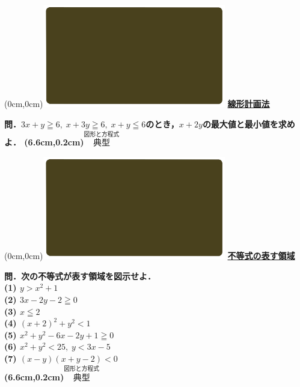 \documentclass[10pt,
fleqn,
dvipdfmx,
uplatex
]{jsarticle}
\begin{document}
\at(0cm,0cm){\includegraphics[width=8cm,bb=0 0 1920 1080]{./youtube/thumbnails/templates/smart_background/図形と方程式.jpeg}}
{\color{orange}\bf\boldmath\huge\underline{線形計画法}}\vspace{0.3zw}

\LARGE 
\bf\boldmath 問．$3x+y\geqq 6,\;x+3y\geqq 6,\;x+y\leqq 6$のとき，$x+2y$の最大値と最小値を求めよ．
\at(6.6cm,0.2cm){\small\color{bradorange}$\overset{\text{図形と方程式}}{\text{典型}}$}


\newpage



\at(0cm,0cm){\includegraphics[width=8cm,bb=0 0 1920 1080]{./youtube/thumbnails/templates/smart_background/図形と方程式.jpeg}}
{\color{orange}\bf\boldmath\huge\underline{不等式の表す領域}}\vspace{0.3zw}

\small 
\bf\boldmath 問．次の不等式が表す領域を図示せよ．\\
(1)  $y>x^2+1$\\
(2)  $3x-2y-2\geqq 0$\\
(3)  $x\leqq 2$\\
(4)  $\left(x+2\right)^2+y^2<1$\\
(5)  $x^2+y^2-6x-2y+1\geqq 0$\\
(6)  $x^2+y^2<{25},\;y<3x-5$\\
(7)  $\left(x-y\right)\left(x+y-2\right)<0$\\

\at(6.6cm,0.2cm){\small\color{bradorange}$\overset{\text{図形と方程式}}{\text{典型}}$}


\newpage
\end{document}
